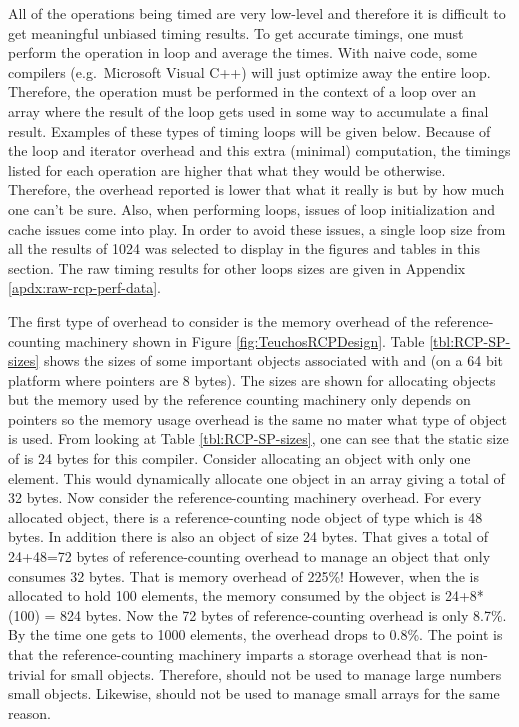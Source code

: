 \documentclass[pdf,ps2pdf,11pt]{SANDreport}
\begin{document}
All of the operations being timed are very low-level and therefore it
is difficult to get meaningful unbiased timing results.  To get
accurate timings, one must perform the operation in loop and average
the times.  With naive code, some compilers (e.g.\ Microsoft Visual
C++) will just optimize away the entire loop.  Therefore, the
operation must be performed in the context of a loop over an array
where the result of the loop gets used in some way to accumulate a
final result.  Examples of these types of timing loops will be given
below.  Because of the loop and iterator overhead and this extra
(minimal) computation, the timings listed for each operation are
higher that what they would be otherwise.  Therefore, the overhead
reported is lower that what it really is but by how much one can't be
sure.  Also, when performing loops, issues of loop initialization and
cache issues come into play.  In order to avoid these issues, a single
loop size from all the results of 1024 was selected to display in the
figures and tables in this section.  The raw timing results for other
loops sizes are given in Appendix {}\ref{apdx:raw-rcp-perf-data}.

The first type of overhead to consider is the memory overhead of the
reference-counting machinery shown in Figure
{}\ref{fig:TeuchosRCPDesign}.  Table {}\ref{tbl:RCP-SP-sizes} shows
the sizes of some important objects associated with {} and
{} (on a 64 bit platform where pointers are 8
bytes).  The sizes are shown for allocating
{} objects but the memory used by the
reference counting machinery only depends on pointers so the memory
usage overhead is the same no mater what type of object is used.  From
looking at Table {}\ref{tbl:RCP-SP-sizes}, one can see that the static
size of {} is 24 bytes for this compiler.
Consider allocating an {} object with only
one element.  This would dynamically allocate one {}
object in an array giving a total of 32 bytes.  Now consider the
reference-counting machinery overhead.  For every allocated
{} object, there is a reference-counting node
object of type {} which is
48 bytes.  In addition there is also an {} object of size 24 bytes.  That gives a total of 24+48=72 bytes of
reference-counting overhead to manage an object that only consumes 32
bytes.  That is memory overhead of 225\%!  However, when the
{} is allocated to hold 100 elements, the
memory consumed by the {} object is
24+8*(100) = 824 bytes.  Now the 72 bytes of reference-counting
overhead is only 8.7\%.  By the time one gets to 1000 elements, the
overhead drops to 0.8\%.  The point is that the reference-counting
machinery imparts a storage overhead that is non-trivial for small
objects.  Therefore, {} should not be used to manage large
numbers small objects.  Likewise, {} should not be used
to manage small arrays for the same reason.
\end{document}
